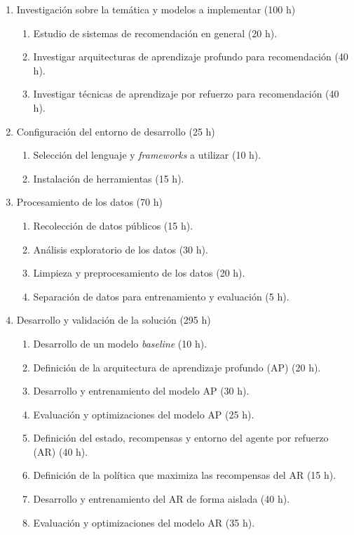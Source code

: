 \documentclass[
11pt, %
]{charter}
\begin{document}
\begin{enumerate}
\item Investigación sobre la temática y modelos a implementar (100 h)
	\begin{enumerate}
	\item Estudio de sistemas de recomendación en general (20 h).
	\item Investigar arquitecturas de aprendizaje profundo para recomendación (40 h).
	\item Investigar técnicas de aprendizaje por refuerzo para recomendación (40 h).
	\end{enumerate}
\item Configuración del entorno de desarrollo (25 h)
	\begin{enumerate}
	\item Selección del lenguaje y \textit{frameworks} a utilizar (10 h).
	\item Instalación de herramientas (15 h).
	\end{enumerate}
\item Procesamiento de los datos (70 h)
	\begin{enumerate}
	\item Recolección de datos públicos (15 h).
	\item Análisis exploratorio de los datos (30 h).
	\item Limpieza y preprocesamiento de los datos (20 h).
	\item Separación de datos para entrenamiento y evaluación (5 h).
	\end{enumerate}
\item Desarrollo y validación de la solución (295 h)
	\begin{enumerate}
	\item Desarrollo de un modelo \textit{baseline} (10 h).
	\item Definición de la arquitectura de aprendizaje profundo (AP) (20 h).
	\item Desarrollo y entrenamiento del modelo AP (30 h).
	\item Evaluación y optimizaciones del modelo AP (25 h).
	\item Definición del estado, recompensas y entorno del agente por refuerzo (AR) (40 h).
	\item Definición de la política que maximiza las recompensas del AR (15 h).
	\item Desarrollo y entrenamiento del AR de forma aislada (40 h).
	\item Evaluación y optimizaciones del modelo AR (35 h).

\end{enumerate}
\end{enumerate}
\end{document}
